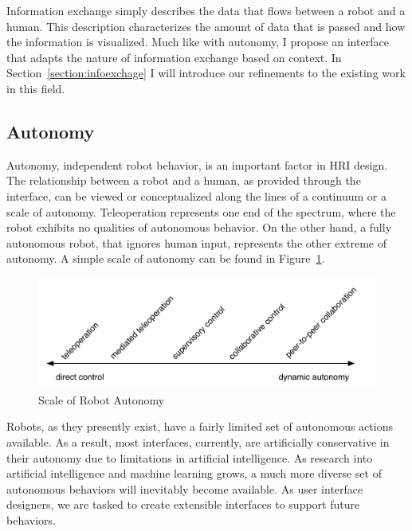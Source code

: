 Information exchange simply describes the data that flows between a robot and a human. This description characterizes the amount of data that is passed and how the information is visualized. Much like with autonomy, I propose an interface that adapts the nature of information exchange based on context. In Section~\ref{section:infoexchage} I will introduce our refinements to the existing work in this field.


\subsection{Autonomy}

Autonomy, independent robot behavior, is an important factor in HRI design. The relationship between a robot and a human, as provided through the interface, can be viewed or conceptualized along the lines of a continuum or a scale of autonomy. Teleoperation represents one end of the spectrum, where the robot exhibits no qualities of autonomous behavior. On the other hand, a fully autonomous robot, that ignores human input, represents the other extreme of autonomy. A simple scale of autonomy can be found in Figure~\ref{fig:autonomy}. \cite{Goodrich_Survey}


\begin{figure}[ht]
\begin{center}
\includegraphics[width=5in]{images/autonomy.pdf}
\caption{Scale of Robot Autonomy\label{fig:autonomy}}
\end{center}
\end{figure}

Robots, as they presently exist, have a fairly limited set of autonomous actions available. As a result, most interfaces, currently, are artificially conservative in their autonomy due to limitations in artificial intelligence. As research into artificial intelligence and machine learning grows, a much more diverse set of autonomous behaviors will inevitably become available. As user interface designers, we are tasked to create extensible interfaces to support future behaviors.

